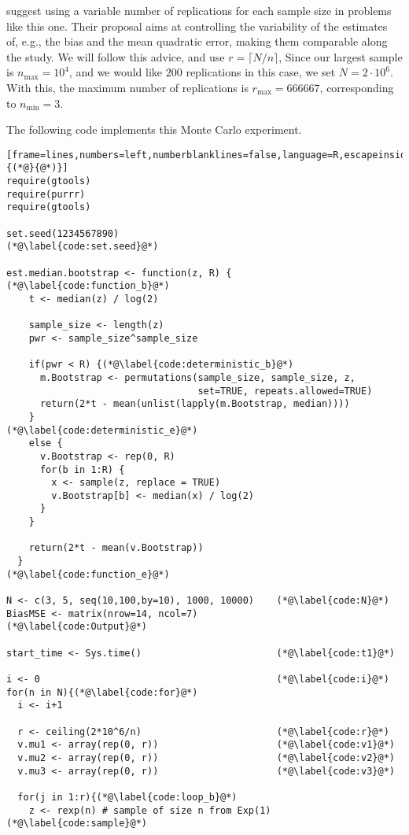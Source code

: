 \citet{busto92} suggest using a variable number of replications for each sample size in problems like this one.
Their proposal aims at controlling the variability of the estimates of, e.g., the bias and the mean quadratic error, making them comparable along the study.
We will follow this advice, and use $r=\lceil N/n\rceil$, 
Since our largest sample is $n_{\max}=10^4$, and we would like $200$ replications in this case, we set $N=2\cdot 10^6$.
With this, the maximum number of replications is $r_{\max}=666667$, corresponding to $n_{\min}=3$.

The following code implements this Monte Carlo experiment.

\begin{lstlisting}[frame=lines,numbers=left,numberblanklines=false,language=R,escapeinside={(*@}{@*)}]
require(gtools)
require(purrr)
require(gtools)

set.seed(1234567890)							(*@\label{code:set.seed}@*)

est.median.bootstrap <- function(z, R) {		(*@\label{code:function_b}@*)
    t <- median(z) / log(2)
    
    sample_size <- length(z)
    pwr <- sample_size^sample_size
    
    if(pwr < R) {(*@\label{code:deterministic_b}@*)
      m.Bootstrap <- permutations(sample_size, sample_size, z, 
                                  set=TRUE, repeats.allowed=TRUE)
      return(2*t - mean(unlist(lapply(m.Bootstrap, median))))
    } 																(*@\label{code:deterministic_e}@*)
    else {
      v.Bootstrap <- rep(0, R)
      for(b in 1:R) {
        x <- sample(z, replace = TRUE)
        v.Bootstrap[b] <- median(x) / log(2)
      }
    }
    
    return(2*t - mean(v.Bootstrap))
  }												(*@\label{code:function_e}@*)

N <- c(3, 5, seq(10,100,by=10), 1000, 10000)	(*@\label{code:N}@*)
BiasMSE <- matrix(nrow=14, ncol=7)				(*@\label{code:Output}@*)

start_time <- Sys.time()						(*@\label{code:t1}@*)

i <- 0											(*@\label{code:i}@*)
for(n in N){(*@\label{code:for}@*)
  i <- i+1
  
  r <- ceiling(2*10^6/n)						(*@\label{code:r}@*)
  v.mu1 <- array(rep(0, r))						(*@\label{code:v1}@*)
  v.mu2 <- array(rep(0, r))						(*@\label{code:v2}@*)
  v.mu3 <- array(rep(0, r))						(*@\label{code:v3}@*)
  
  for(j in 1:r){(*@\label{code:loop_b}@*)
    z <- rexp(n) # sample of size n from Exp(1)	(*@\label{code:sample}@*)
    

\end{lstlisting}
